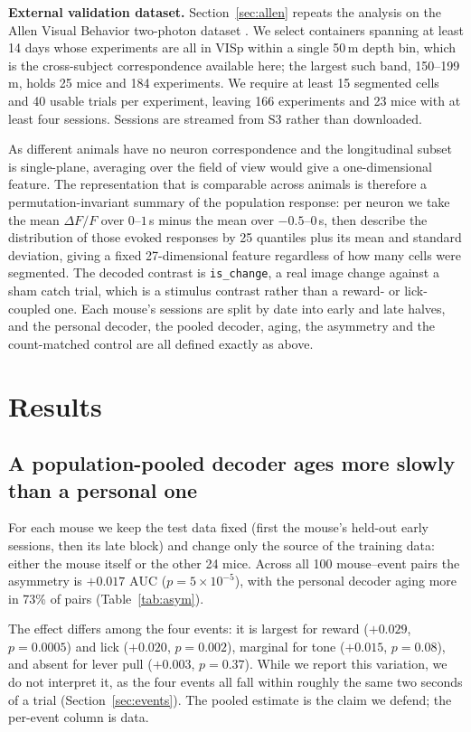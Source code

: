 \documentclass[mlabstract,onecolumn]{jmlr}
\newcommand{\auc}{\mathrm{AUC}}
\begin{document}
\textbf{External validation dataset.} Section~\ref{sec:allen} repeats the analysis on the Allen
Visual Behavior two-photon dataset \citep{allenvb2023}. We select containers spanning at least 14
days whose experiments are all in VISp within a single 50\,\textmu m depth bin, which is the
cross-subject correspondence available here; the largest such band, 150--199\,\textmu m, holds 25
mice and 184 experiments. We require at least 15 segmented cells and 40 usable trials per
experiment, leaving 166 experiments and 23 mice with at least four sessions. Sessions are streamed
from S3 rather than downloaded.

As different animals have no neuron correspondence and the longitudinal subset is single-plane,
averaging over the field of view would give a one-dimensional feature. The representation that is
comparable across animals is
therefore a permutation-invariant summary of the population response: per neuron we take the mean
$\Delta F/F$ over $0$--$1$\,s minus the mean over $-0.5$--$0$\,s, then describe the distribution of
those evoked responses by 25 quantiles plus its mean and standard deviation, giving a fixed
27-dimensional feature regardless of how many cells were segmented. The decoded contrast is
\texttt{is\_change}, a real image change against a sham catch trial, which is a stimulus contrast
rather than a reward- or lick-coupled one. Each mouse's sessions are split by date into early and
late halves, and the personal decoder, the pooled decoder, aging, the asymmetry and the
count-matched control are all defined exactly as above.

\section{Results}

\subsection{A population-pooled decoder ages more slowly than a personal one}
\label{sec:asym}
For each mouse we keep the test data fixed (first the mouse's held-out early sessions, then its late
block) and change only the source of the training data: either the mouse itself or the other 24 mice.
Across all 100 mouse--event pairs the asymmetry is $+0.017$ $\auc$ ($p = 5 \times 10^{-5}$), with the
personal decoder aging more in 73\% of pairs (Table~\ref{tab:asym}).

The effect differs among the four events: it is largest for reward ($+0.029$, $p = 0.0005$) and lick
($+0.020$, $p = 0.002$), marginal for tone ($+0.015$, $p = 0.08$), and absent for lever pull
($+0.003$, $p = 0.37$). While we report this variation, we do not interpret it, as the four events
all fall within roughly the same two seconds of a trial (Section~\ref{sec:events}). The pooled
estimate is the claim we defend; the per-event column is data.
\end{document}
